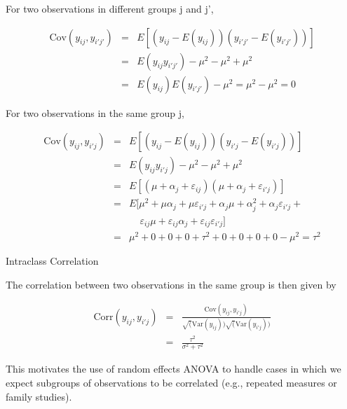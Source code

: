 \documentclass[ignorenonframetext,]{beamer}
\begin{document}
\begin{frame}{}

For two observations in different groups j and j',

\begin{eqnarray*}
\text{Cov}(y_{ij},y_{i'j'})&=& E[(y_{ij}-E(y_{ij}))(y_{i'j'}-E(y_{i'j'}))] \\
&=& E(y_{ij}y_{i'j'})-\mu^2-\mu^2+\mu^2 \\
&=& E(y_{ij})E(y_{i'j'})-\mu^2=\mu^2-\mu^2=0
\end{eqnarray*}

\vspace{.1in}

For two observations in the same group j,

\begin{eqnarray*}
\text{Cov}(y_{ij},y_{i'j})&=& E[(y_{ij}-E(y_{ij}))(y_{i'j}-E(y_{i'j}))] \\
&=& E(y_{ij}y_{i'j})-\mu^2-\mu^2+\mu^2 \\
&=& E[(\mu+\alpha_j+\varepsilon_{ij})(\mu+\alpha_j + \varepsilon_{i'j})] \\
&=& E[\mu^2+\mu\alpha_j+\mu\varepsilon_{i'j}+\alpha_j\mu+\alpha_j^2+\alpha_j\varepsilon_{i'j}+ \\
& & ~~~~~\varepsilon_{ij}\mu+\varepsilon_{ij}\alpha_j+\varepsilon_{ij}\varepsilon_{i'j}] \\ 
&=& \mu^2 + 0 + 0 + 0 + \tau^2 + 0 + 0 + 0 + 0 -\mu^2=\tau^2
\end{eqnarray*}

\end{frame}

\begin{frame}{Intraclass Correlation}

The correlation between two observations in the same group is then given
by

\begin{eqnarray*}
\text{Corr}(y_{ij},y_{i'j})&=&\frac{\text{Cov}(y_{ij},y_{i'j})}{\sqrt(\text{Var}(y_{ij}))\sqrt(\text{Var}(y_{i'j}))} \\
&=& \frac{\tau^2}{\sigma^2+\tau^2}
\end{eqnarray*}

This motivates the use of random effects ANOVA to handle cases in which
we expect subgroups of observations to be correlated (e.g., repeated
measures or family studies).

\end{frame}
\end{document}
